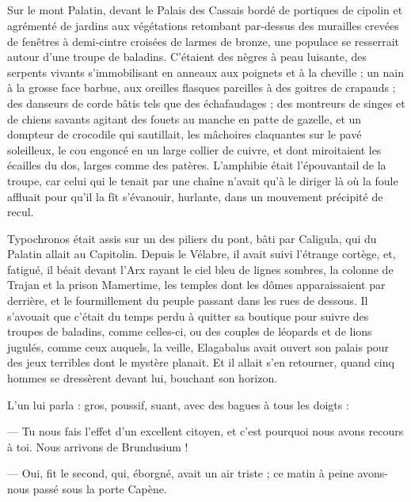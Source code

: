 \documentclass[a4paper, 11pt, oneside, polutonikogreek, french]{article}
\begin{document}
\subsection{}
\paragraph{}
Sur le mont Palatin, devant le Palais des Cassais bordé de portiques de cipolin et agrémenté de jardins aux végétations retombant par-dessus des murailles crevées de fenêtres à demi-cintre croisées de larmes de bronze, une populace se resserrait autour d'une troupe de baladins. C'étaient des nègres à peau luisante, des serpents vivants s'immobilisant en anneaux aux poignets et à la cheville ; un nain à la grosse face barbue, aux oreilles flasques pareilles à des goitres de crapauds ; des danseurs de corde bâtis tels que des échafaudages ; des montreurs de singes et de chiens savants agitant des fouets au manche en patte de gazelle, et un dompteur de crocodile qui sautillait, les mâchoires claquantes sur le pavé soleilleux, le cou engoncé en un large collier de cuivre, et dont miroitaient les écailles du dos, larges comme des patères. L'amphibie était l'épouvantail de la troupe, car celui qui le tenait par une chaîne n'avait qu'à le diriger là où la foule affluait pour qu'il la fît s'évanouir, hurlante, dans un mouvement précipité de recul.

Typochronos était assis sur un des piliers du pont, bâti par Caligula, qui du Palatin allait au Capitolin. Depuis le Vélabre, il avait suivi l'étrange cortège, et, fatigué, il béait devant l'Arx rayant le ciel bleu de lignes sombres, la colonne de Trajan et la prison Mamertime, les temples dont les dômes apparaissaient par derrière, et le fourmillement du peuple passant dans les rues de dessous. Il s'avouait que c'était du temps perdu à quitter sa boutique pour suivre des troupes de baladins, comme celles-ci, ou des couples de léopards et de lions jugulés, comme ceux auquels, la veille, Elagabalus avait ouvert son palais pour des jeux terribles dont le mystère planait. Et il allait s'en retourner, quand cinq hommes se dressèrent devant lui, bouchant son horizon.

L'un lui parla : gros, poussif, suant, avec des bagues à tous les doigts :

--- Tu nous fais l'effet d'un excellent citoyen, et c'est pourquoi nous avons recours à toi. Nous arrivons de Brundusium !

--- Oui, fit le second, qui, éborgné, avait un air triste ; ce matin à peine avons-nous passé sous la porte Capène.
\end{document}
